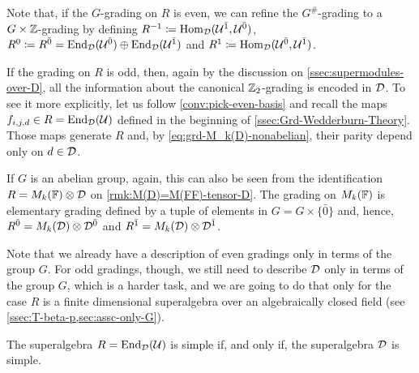 \begin{remark}\label{rmk:even-ZZ-grading}
    Note that, if the $G$-grading on $R$ is even, we can refine the $G^\#$-grading to a $G\times \mathbb{Z}$-grading by defining $R^{-1} \coloneqq \operatorname{Hom}_{\mathcal{D}} (\mathcal U^{\bar1}, \mathcal U^{\bar0})$, $R^0 \coloneqq R^{\bar0} = \operatorname{End}_{\mathcal{D}}(\mathcal U^{\bar0}) \oplus \operatorname{End}_{\mathcal{D}}(\mathcal U^{\bar1})$ and $R^1 \coloneqq \operatorname{Hom}_{\mathcal{D}} (\mathcal U^{\bar0}, \mathcal U^{\bar1})$. 
\end{remark}

If the grading on $R$ is odd, then, again by the discussion on \cref{ssec:supermodules-over-D}, all the information about the canonical $\mathbb{Z}_2$-grading is encoded in $\mathcal{D}$. 
To see it more explicitly, let us follow \cref{conv:pick-even-basis} and recall the maps $f_{i, j, d} \in R = \operatorname{End}_{\mathcal{D}} (\mathcal U)$ defined in the beginning of \cref{ssec:Grd-Wedderburn-Theory}. 
Those maps generate $R$ and, by \cref{eq:grd-M_k(D)-nonabelian}, their parity depend only on $d \in \mathcal{D}$. 

If $G$ is an abelian group, again, this can also be seen from the identification $R = M_k(\mathbb{F})\otimes \mathcal{D}$ on \cref{rmk:M(D)=M(FF)-tensor-D}. 
The grading on $M_k(\mathbb{F})$ is elementary grading defined by a tuple of elements in $G = G \times \{ \bar 0 \}$ and, hence,  $R^{\bar0} = M_k(\mathcal{D}) \otimes \mathcal{D}^{\bar0}$ and $R^{\bar1} = M_k(\mathcal{D}) \otimes \mathcal{D}^{\bar1}$. 


Note that we already have a description of even gradings only in terms of the group $G$. 
For odd gradings, though, we still need to describe $\mathcal{D}$ only in terms of the group $G$, which is a harder task, and we are going to do that only for the case $R$ is a finite dimensional superalgebra over an algebraically closed field (see \cref{ssec:T-beta-p,sec:assc-only-G}).
 
\begin{prop}\label{prop:simple-R-D-super}
	The superalgebra $R = \operatorname{End}_{\mathcal{D}} (\mathcal U)$ is simple if, and only if, the superalgebra $\mathcal{D}$ is simple.
\end{prop}

